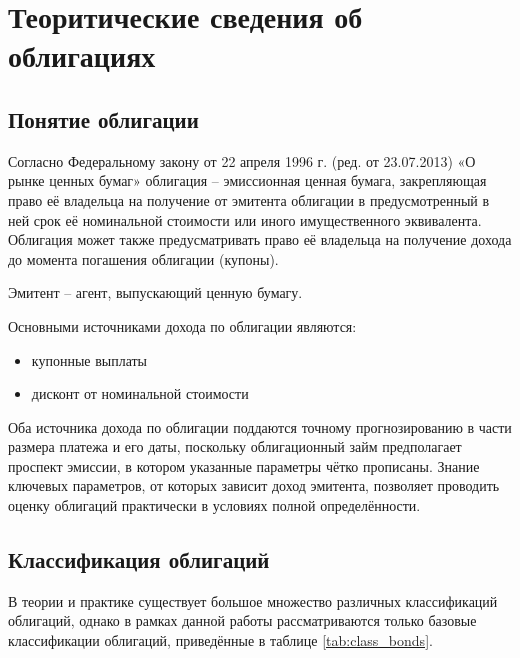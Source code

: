 \chapter{Теоритические сведения об облигациях}
\section{Понятие облигации}
Согласно Федеральному закону от 22 апреля 1996 г. (ред. от 23.07.2013) «О рынке ценных бумаг» облигация – эмиссионная ценная бумага, закрепляющая право её владельца на получение от эмитента облигации в предусмотренный в ней срок её номинальной стоимости или иного имущественного эквивалента. Облигация может также предусматривать право её владельца на получение дохода до момента погашения облигации (купоны).

Эмитент – агент, выпускающий ценную бумагу.

Основными источниками дохода по облигации являются: 
\begin{itemize}
	\item купонные выплаты
	\item дисконт от номинальной стоимости
\end{itemize}
Оба источника дохода по облигации поддаются точному прогнозированию в части размера платежа и его даты, поскольку облигационный займ предполагает проспект эмиссии, в котором указанные параметры чётко прописаны. Знание ключевых параметров, от которых зависит доход эмитента, позволяет проводить оценку облигаций практически в условиях полной определённости.

\section{Классификация облигаций}

В теории и практике существует большое множество различных классификаций облигаций, однако в рамках данной работы рассматриваются только базовые классификации облигаций, приведённые в таблице \ref{tab:class_bonds}.

